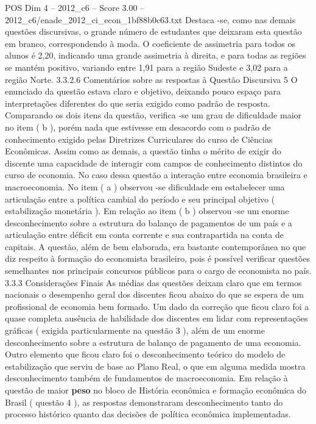 \begin{textsample}{POS Dim 4 – 2012\_c6 – Score 3.00 – 2012\_c6/enade\_2012\_ci\_econ\_1bf88b0c63.txt}
Destaca -se, como nas demais questões discursivas, o grande número de estudantes que deixaram esta questão em branco, correspondendo à moda.
O coeficiente de assimetria para todos os alunos é 2,20, indicando uma grande assimetria à direita, e para todas as regiões se mantém positivo, variando entre 1,91 para a região Sudeste e 3,02 para a região Norte. 3.3.2.6 Comentários sobre as respostas à Questão Discursiva 5 O enunciado da questão estava claro e objetivo, deixando pouco espaço para interpretações diferentes do que seria exigido como padrão de resposta.
Comparando os dois itens da questão, verifica -se um grau de dificuldade maior no item ( b ), porém nada que estivesse em desacordo com o padrão de conhecimento exigido pelas Diretrizes Curriculares do curso de Ciências Econômicas.
Assim como as demais, a questão tinha o mérito de exigir do discente uma capacidade de interagir com campos de conhecimento distintos do curso de economia.
No caso dessa questão a interação entre economia brasileira e macroeconomia.
No item ( a ) observou -se dificuldade em estabelecer uma articulação entre a política cambial do período e seu principal objetivo ( estabilização monetária ).
Em relação ao item ( b ) observou -se um enorme desconhecimento sobre a estrutura do balanço de pagamentos de um país e a articulação entre déficit em conta corrente e sua contrapartida na conta de capitais.
A questão, além de bem elaborada, era bastante contemporânea no que diz respeito à formação do economista brasileiro, pois é possível verificar questões semelhantes nos principais concursos públicos para o cargo de economista no país. 3.3.3 Considerações Finais As médias das questões deixam claro que em termos nacionais o desempenho geral dos discentes ficou abaixo do que se espera de um profissional de economia bem formado.
Um dado da correção que ficou claro foi a quase completa ausência de habilidade dos discentes em lidar com representações gráficas ( exigida particularmente na questão 3 ), além de um enorme desconhecimento sobre a estrutura de balanço de pagamento de uma economia.
Outro elemento que ficou claro foi o desconhecimento teórico do modelo de estabilização que serviu de base ao Plano Real, o que em alguma medida mostra desconhecimento também de fundamentos de macroeconomia.
Em relação à questão de maior \textbf{peso} no bloco de História econômica e formação econômica do Brasil ( questão 4 ), as respostas demonstraram desconhecimento tanto do processo histórico quanto das decisões de política econômica implementadas.

\end{textsample}
